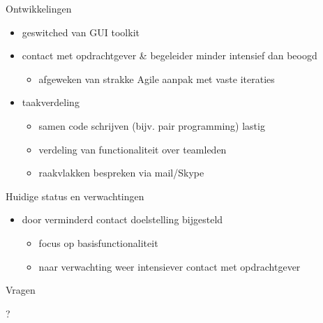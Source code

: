 \documentclass[10pt]{beamer}
\begin{document}
\begin{frame}{Ontwikkelingen}
 
    \begin{itemize}
        \item geswitched van GUI toolkit
        \item contact met opdrachtgever \& begeleider minder intensief dan beoogd
        \begin{itemize}
         \item afgeweken van strakke Agile aanpak met vaste iteraties
        \end{itemize}
        \item taakverdeling
        \begin{itemize}
         \item samen code schrijven (bijv. pair programming) lastig
         \item verdeling van functionaliteit over teamleden
         \item raakvlakken bespreken via mail/Skype
        \end{itemize}

    \end{itemize}

\end{frame}


\begin{frame}{Huidige status en verwachtingen}

    \begin{itemize}
        \item door verminderd contact doelstelling bijgesteld
        \begin{itemize}
         \item focus op basisfunctionaliteit
         \item naar verwachting weer intensiever contact met opdrachtgever
        \end{itemize}

    \end{itemize}

\end{frame}


\begin{frame}{Vragen}

?

\end{frame}
\end{document}
